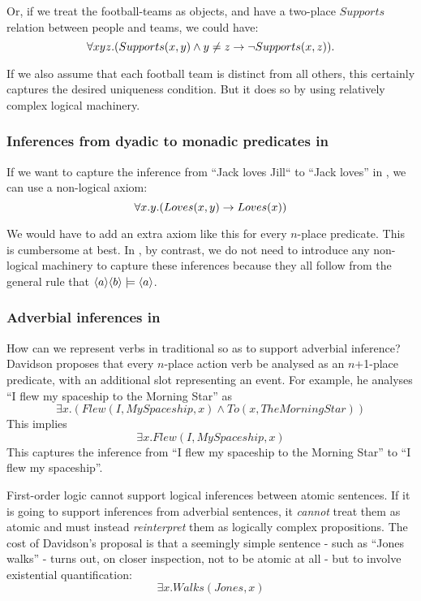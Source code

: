 \NI Or, if we treat the football-teams as objects, and have a
two-place $Supports$ relation between people and teams, we could have:
\[
   \forall x y z . (Supports(x,y) \land y \neq z \rightarrow \neg Supports(x,z)).
\]   

\NI If we also assume that each football team is distinct from all 
others, this certainly captures the desired uniqueness condition.  But
it does so by using relatively complex logical machinery.



\subsubsection{Inferences from dyadic to monadic predicates in \fol{}}
If we want to capture the inference from ``Jack loves Jill`` to ``Jack
loves'' in \fol{}, we can use a non-logical axiom:
\[
   \forall x. y .( Loves(x,y) \rightarrow Loves(x))
\]

\NI We would have to add an extra  axiom like this for every
$n$-place predicate.  This is cumbersome at best.  In \cathoristic{}, by
contrast, we do not need to introduce any non-logical machinery 
to capture these inferences because they all follow from the general
rule that $\MAY{a} \MAY{b} \models \MAY{a}$.

\subsubsection{Adverbial inferences in \fol{}}

\NI How can we represent verbs in traditional \fol{} so as to
support adverbial inference?  Davidson \cite{davidson2} proposes that
every $n$-place action verb be analysed as an $n$+1-place predicate,
with an additional slot representing an event.  For example, he
analyses ``I flew my spaceship to the Morning Star'' as
\[
\exists x. ( Flew(I, MySpaceship, x) \land To(x, TheMorningStar))
\]
This implies 
\[
\exists x.  Flew(I, MySpaceship, x)
\]
This captures the inference from ``I flew my spaceship to the Morning
Star'' to ``I flew my spaceship''.

First-order logic cannot support logical inferences between atomic
sentences.  If it is going to support inferences from adverbial
sentences, it \emph{cannot} treat them as atomic and must instead
\emph{reinterpret} them as logically complex propositions.  The cost
of Davidson's proposal is that a seemingly simple sentence - such as
``Jones walks'' - turns out, on closer inspection, not to be atomic at
all - but to involve existential quantification:
\[
\exists x.  Walks(Jones, x)
\]

